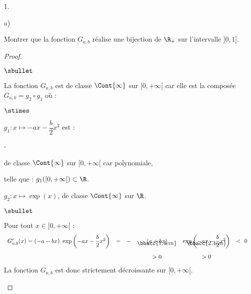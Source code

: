 \documentclass[11pt]{article}%
\begin{document}
\begin{noliste}{1.}
\item
  \begin{noliste}{a)}
    \setlength{\itemsep}{2mm}
  \item Montrer que la fonction $G_{a,b}$ réalise une bijection de
    $\R_+$ sur l'intervalle $]0,1]$.
    
    \begin{proof}~
      \begin{noliste}{$\sbullet$}
      \item La fonction $G_{a, b}$ est de classe $\Cont{\infty}$ sur $[0,
        +\infty[$ car elle est la composée $G_{a, b} = g_2 \circ g_1$ 
	où :
      \end{noliste}
      \begin{liste}{$\stimes$}
      \item $g_1 : x \mapsto -a x - \dfrac{b}{2} x^2$ est :
        \begin{noliste}{-}
        \item de classe $\Cont{\infty}$ sur $[0, +\infty[$ car
          polynomiale,
        \item telle que : $g_1([0, +\infty[) \subset \R$.
        \end{noliste}
      \item $g_2 : x \mapsto \exp(x)$, de classe $\Cont{\infty}$ sur $\R$.
      \end{liste}

      \begin{noliste}{$\sbullet$}
      \item Pour tout $x \in [0, +\infty[$ :
        \[
        \begin{array}{cccccc}
          G'_{a, b}(x) = (- a - b x) \ \exp\left( -a x - \dfrac{b}{2}
            x^2 \right) & = & - & (a+bx) & \exp\left( -a x - \dfrac{b}{2} x^2
          \right) & < \ 0 \\[-.5cm]
          & & & \bbacc{1.4cm} & \bbacc{2.4cm} & \\[.4cm]
          & & & > 0 & > 0 
        \end{array}
        \]
        La fonction $G_{a, b}$ est donc strictement décroissante sur
        $[0, +\infty[$.


\end{noliste}
\end{proof}
\end{noliste}
\end{noliste}
\end{document}
